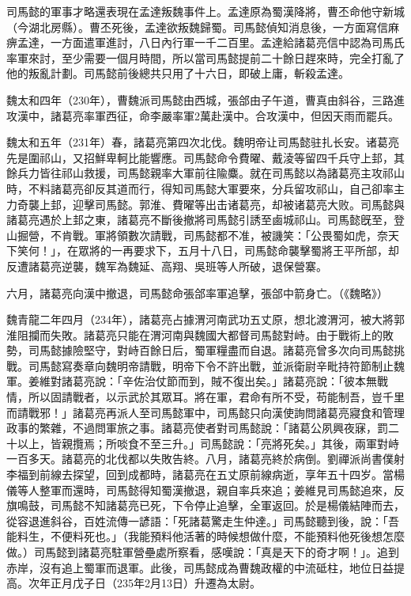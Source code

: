 司馬懿的軍事才略還表現在孟達叛魏事件上。孟達原為蜀漢降將，曹丕命他守新城（今湖北房縣）。曹丕死後，孟達欲叛魏歸蜀。司馬懿偵知消息後，一方面寫信麻痹孟達，一方面遣軍進討，八日內行軍一千二百里。孟達給諸葛亮信中認為司馬氏率軍來討，至少需要一個月時間，所以當司馬懿提前二十餘日趕來時，完全打亂了他的叛亂計劃。司馬懿前後總共只用了十六日，即破上庸，斬殺孟達。

魏太和四年（230年），曹魏派司馬懿由西城，張郃由子午道，曹真由斜谷，三路進攻漢中，諸葛亮率軍西征，命李嚴率軍2萬赴漢中。合攻漢中，但因天雨而罷兵。

魏太和五年（231年）春，諸葛亮第四次北伐。魏明帝让司馬懿驻扎长安。诸葛亮先是圍祁山，又招鮮卑軻比能響應。司馬懿命令費曜、戴淩等留四千兵守上邽，其餘兵力皆往祁山救援，司馬懿親率大軍前往隃麋。就在司馬懿以為諸葛亮主攻祁山時，不料諸葛亮卻反其道而行，得知司馬懿大軍要來，分兵留攻祁山，自己卻率主力奇襲上邽，迎擊司馬懿。郭淮、費曜等出击诸葛亮，却被诸葛亮大败。司馬懿與諸葛亮遇於上邽之東，諸葛亮不斷後撤將司馬懿引誘至鹵城祁山。司馬懿旣至，登山掘營，不肯戰。軍將領數次請戰，司馬懿都不准，被譏笑：「公畏蜀如虎，奈天下笑何！」，在眾將的一再要求下，五月十八日，司馬懿命襲擊蜀將王平所部，却反遭諸葛亮逆襲，魏军為魏延、高翔、吳班等人所破，退保營寨。

六月，諸葛亮向漢中撤退，司馬懿命張郃率軍追擊，張郃中箭身亡。（《魏略》）

魏青龍二年四月（234年），諸葛亮占據渭河南武功五丈原，想北渡渭河，被大將郭淮阻攔而失敗。諸葛亮只能在渭河南與魏國大都督司馬懿對峙。由于戰術上的敗勢，司馬懿據險堅守，對峙百餘日后，蜀軍糧盡而自退。諸葛亮曾多次向司馬懿挑戰。司馬懿寫奏章向魏明帝請戰，明帝下令不許出戰，並派衛尉辛毗持符節制止魏軍。姜維對諸葛亮說：「辛佐治仗節而到，賊不復出矣。」諸葛亮說：「彼本無戰情，所以固請戰者，以示武於其眾耳。將在軍，君命有所不受，苟能制吾，豈千里而請戰邪！」諸葛亮再派人至司馬懿軍中，司馬懿只向漢使詢問諸葛亮寢食和管理政事的繁雜，不過問軍旅之事。諸葛亮使者對司馬懿說：「諸葛公夙興夜寐，罰二十以上，皆親攬焉；所啖食不至三升。」司馬懿說：「亮將死矣。」其後，兩軍對峙一百多天。諸葛亮的北伐都以失敗告終。八月，諸葛亮終於病倒。劉禪派尚書僕射李福到前線去探望，回到成都時，諸葛亮在五丈原前線病逝，享年五十四岁。當楊儀等人整軍而還時，司馬懿得知蜀漢撤退，親自率兵來追；姜維見司馬懿追來，反旗鳴鼓，司馬懿不知諸葛亮已死，下令停止追擊，全軍返回。於是楊儀結陣而去，從容退進斜谷，百姓流傳一諺語：「死諸葛驚走生仲達。」司馬懿聽到後，說：「吾能料生，不便料死也。」（我能預料他活著的時候想做什麼，不能預料他死後想怎麼做。）司馬懿到諸葛亮駐軍營壘處所察看，感嘆說：「真是天下的奇才啊！」。追到赤岸，沒有追上蜀軍而退軍。此後，司馬懿成為曹魏政權的中流砥柱，地位日益提高。次年正月戊子日（235年2月13日）升遷為太尉。

